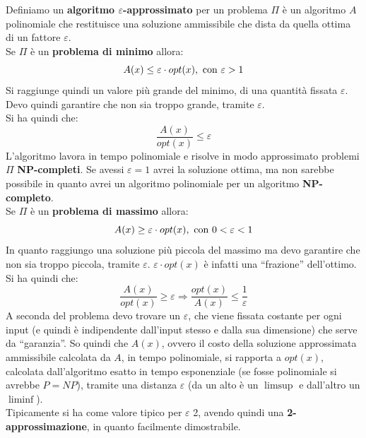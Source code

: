 										\begin{definizione}
											Definiamo un \textbf{algoritmo $\varepsilon$-approssimato} per un problema
											$\Pi$ è un 
											algoritmo $A$ polinomiale che restituisce una soluzione ammissibile che dista
											da quella ottima di un fattore $\varepsilon$.\\
											Se $\Pi$ è un \textbf{problema di minimo} allora:
											\[A(x)\leq \varepsilon\cdot opt(x), \mbox{ \textnormal{con} }\varepsilon>1\]
											Si raggiunge quindi un valore più grande del minimo, di una quantità fissata
											$\varepsilon$. Devo quindi garantire che non sia troppo grande, tramite
											$\varepsilon$.\\
											Si ha quindi che:
											\[\frac{A(x)}{opt(x)}\leq \varepsilon\]
											L'algoritmo lavora in tempo polinomiale e risolve in modo approssimato
											problemi $\Pi$ \textbf{NP-completi}. Se avessi $\varepsilon=1$ avrei la
											soluzione ottima, ma non sarebbe possibile in quanto avrei un algoritmo
											polinomiale per un algoritmo \textbf{NP-completo}.\\
											Se $\Pi$ è un \textbf{problema di massimo} allora:
											\[A(x)\geq \varepsilon\cdot opt(x), \mbox{ \textnormal{con} }0<\varepsilon<1\]
											In quanto raggiungo una soluzione più piccola del massimo ma devo garantire
											che non sia troppo piccola, tramite $\varepsilon$. $\varepsilon\cdot opt(x)$ è
											infatti una ``frazione'' dell'ottimo.\\
											Si ha quindi che:
											\[\frac{A(x)}{opt(x)}\geq \varepsilon\Longrightarrow\frac{opt(x)}{A(x)}\leq
												\frac{1}{\varepsilon}\]
												A seconda del problema devo trovare un $\varepsilon$, che viene fissata
												costante per ogni input (e quindi è indipendente dall'input stesso e dalla sua
												dimensione) che serve da ``garanzia''. So quindi che $A(x)$, ovvero il costo
												della soluzione approssimata ammissibile calcolata da $A$, in tempo
												polinomiale, si rapporta a $opt(x)$, calcolata dall'algoritmo esatto in tempo
												esponenziale (se fosse polinomiale si avrebbe $P=NP$), tramite una distanza
												$\varepsilon$ (da un alto è un $\limsup$ e dall'altro un $\liminf$).\\
												Tipicamente si ha come valore tipico per $\varepsilon$ 2, avendo quindi
												una \textbf{2-approssimazione}, in quanto facilmente dimostrabile.
												\end{definizione}

